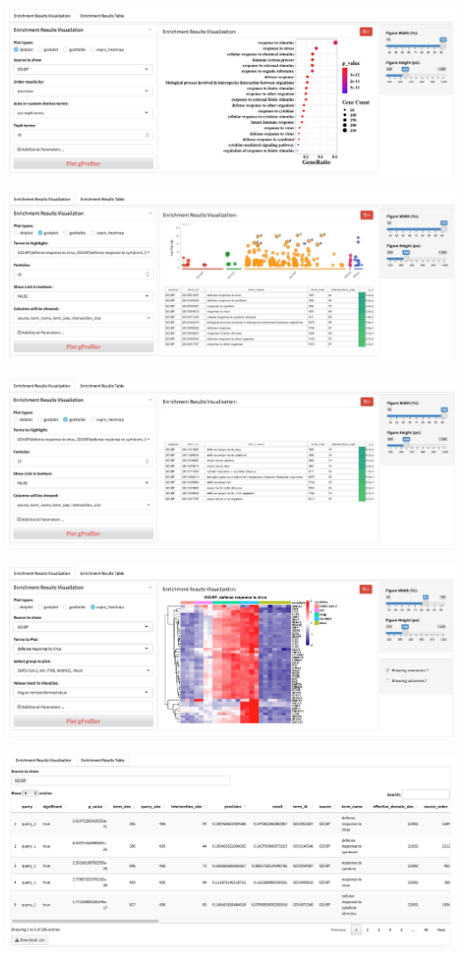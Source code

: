 \documentclass[
  a4paper,
  oneside]{book}
\begin{document}
\includegraphics{images/fucntion-grofiler-dot.jpeg}

\includegraphics{images/fucntion-grofiler-gostdot.jpeg}

\includegraphics{images/fucntion-grofiler-gosttab.jpeg}

\includegraphics{images/fucntion-grofiler-heatmap.jpeg}

\includegraphics{images/fucntion-grofiler-tab.jpeg}
\end{document}
